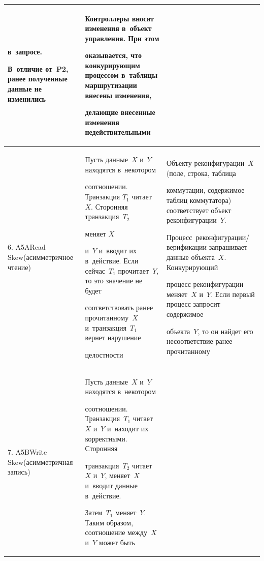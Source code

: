 \begin{table}
\begin{center}
\begin{tabular}{|p{51.7pt}|p{131pt}|p{170.4pt}|}
в~запросе. %


В~отличие от~P2, ранее полученные данные не изменились&


Контроллеры вносят изменения в~объект управ\-ле\-ния. При этом 


оказывается, что конкурирующим процессом в~таб\-ли\-цы маршрутизации внесены изменения, 


делающие внесенные изменения недействительными\\


\hline


6. A5A\newline Read Skew\newline (асим\-мет\-рич\-ное чтение)&


Пусть данные~$X$ и~$Y$ нахо\-дят\-ся в~некотором 


соотно\-шении. Транзакция $T_1$ читает~$X$. Сторонняя транзакция~$T_2$ 


меняет $X$ 


и~$Y$ и~вводит их в~действие. Если сейчас~$T_1$ прочитает~$Y$, то это значение не будет 


соответствовать ранее прочитанному~$X$ и~транзакция~$T_1$ вернет нарушение 


целостности &


Объекту реконфигурации~$X$ (поле, строка, таб\-ли\-ца 


коммутации, содержимое таб\-лиц коммутатора) соответствует объ\-ект реконфигурации~$Y$. 


Процесс~рекон\-фи\-гу\-ра\-ции/ве\-ри\-фи\-ка\-ции запрашивает данные объекта~$X$. Конкурирующий 


процесс реконфигурации меняет~$X$ и~$Y$. Если первый процесс запросит содержимое 


объекта~$Y$, то он найдет его несоответствие ранее прочитанному\\


\hline


7. A5B\newline Write Skew\newline (асим\-мет\-рич\-ная запись)&


Пусть данные~$X$ и~$Y$ находятся в~некотором 


соотношении. Транзакция~$T_1$ читает~$X$ и~$Y$ и~находит их корректными. Сторонняя 


транзакция~$T_2$ читает~$X$ и~$Y$, меняет~$X$ и~вводит данные в~действие. 


Затем~$T_1$ меняет~$Y$. Таким образом, соотношение между~$X$ и~$Y$ может быть 



\end{tabular}
\end{center}
\end{table}
